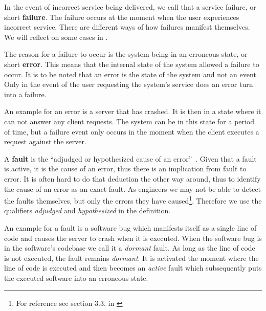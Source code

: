 In the event of incorrect service being delivered, we call that a service failure, or short \textbf{failure}. The failure occurs at the moment when the user experiences incorrect service. There are different ways of how failures manifest themselves. We will reflect on some cases in .

The reason for a failure to occur is the system being in an erroneous state, or short \textbf{error}. This means that the internal state of the system allowed a failure to occur. It is to be noted that an error is the state of the system and not an event. Only in the event of the user requesting the system's service does an error turn into a failure.

An example for an error is a server that has crashed. It is then in a state where it can not answer any client requests. The system can be in this state for a period of time, but a failure event only occurs in the moment when the client executes a request against the server.

A \textbf{fault} is the ``adjudged or hypothesized cause of an error''~\cite{Laprie1995}. Given that a fault is active, it is the cause of an error, thus there is an implication from fault to error. It is often hard to do that deduction the other way around, thus to identify the cause of an error as an exact fault. As engineers we may not be able to detect the faults themselves, but only the errors they have caused\footnote{For reference see section 3.3. in \cite{FundamentalsDepComputing}}. Therefore we use the qualifiers \emph{adjudged} and \emph{hypothesized} in the definition.

An example for a fault is a software bug which manifests itself as a single line of code and causes the server to crash when it is executed. When the software bug is in the software's codebase we call it a \emph{dormant} fault. As long as the line of code is not executed, the fault remains \emph{dormant}. It is activated the moment where the line of code is executed and then becomes an \emph{active} fault which subsequently puts the executed software into an erroneous state.

